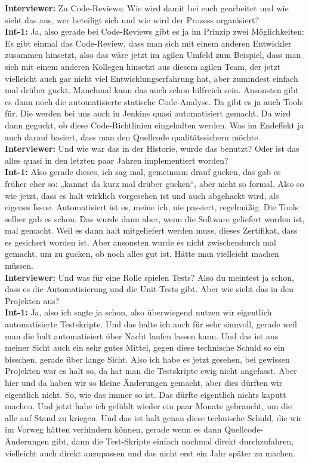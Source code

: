 \textbf{Interviewer:} Zu Code-Reviews: Wie wird damit bei euch gearbeitet und wie sieht das aus, wer beteiligt sich und wie wird der Prozess organisiert?\\
\textbf{Int-1:} Ja, also gerade bei Code-Reviews gibt es ja im Prinzip zwei Möglichkeiten: Es gibt einmal das Code-Review, dass man sich mit einem anderen Entwickler zusammen hinsetzt, also das wäre jetzt im agilen Umfeld zum Beispiel, dass man sich mit einem anderen Kollegen hinsetzt aus diesem agilen Team, der jetzt vielleicht auch gar nicht viel Entwicklungserfahrung hat, aber zumindest einfach mal drüber guckt. Manchmal kann das auch schon hilfreich sein. Ansonsten gibt es dann noch die automatisierte statische Code-Analyse. Da gibt es ja auch Tools für. Die werden bei uns auch in Jenkins quasi automatisiert gemacht. Da wird dann geguckt, ob diese Code-Richtlinien eingehalten werden. Was im Endeffekt ja auch darauf basiert, dass man den Quellcode qualitätssichern möchte.\\
\textbf{Interviewer:} Und wie war das in der Historie, wurde das benutzt? Oder ist das alles quasi in den letzten paar Jahren implementiert worden?\\
\textbf{Int-1:} Also gerade dieses, ich sag mal, gemeinsam drauf gucken, das gab es früher eher so: „kannst da kurz mal drüber gucken“, aber nicht so formal. Also so wie jetzt, dass es halt wirklich vorgesehen ist und auch abgehackt wird, als eigenes Issue. Automatisiert ist es, meine ich, nie passiert, regelmäßig. Die Tools selber gab es schon. Das wurde dann aber, wenn die Software geliefert worden ist, mal gemacht. Weil es dann halt mitgeliefert werden muss, dieses Zertifikat, dass es gesichert worden ist. Aber ansonsten wurde es nicht zwischendurch mal gemacht, um zu gucken, ob noch alles gut ist. Hätte man vielleicht machen müssen.\\
\textbf{Interviewer:} Und was für eine Rolle spielen Tests? Also du meintest ja schon, dass es die Automatisierung und die Unit-Tests gibt. Aber wie sieht das in den Projekten aus?\\
\textbf{Int-1:} Ja, also ich sagte ja schon, also überwiegend nutzen wir eigentlich automatisierte Testskripte. Und das halte ich auch für sehr sinnvoll, gerade weil man die halt automatisiert über Nacht laufen lassen kann. Und das ist aus meiner Sicht auch ein sehr gutes Mittel, gegen diese technische Schuld so ein bisschen, gerade über lange Sicht. Also ich habe es jetzt gesehen, bei gewissen Projekten war es halt so, da hat man die Testskripte ewig nicht angefasst. Aber hier und da haben wir so kleine Änderungen gemacht, aber dies dürften wir eigentlich nicht. So, wie das immer so ist. Das dürfte eigentlich nichts kaputt machen. Und jetzt habe ich gefühlt wieder ein paar Monate gebraucht, um die alle auf Stand zu kriegen. Und das ist halt genau diese technische Schuld, die wir im Vorweg hätten verhindern können, gerade wenn es dann Quellcode-Änderungen gibt, dann die Test-Skripte einfach nochmal direkt durchzufahren, vielleicht auch direkt anzupassen und das nicht erst ein Jahr später zu machen.\\
